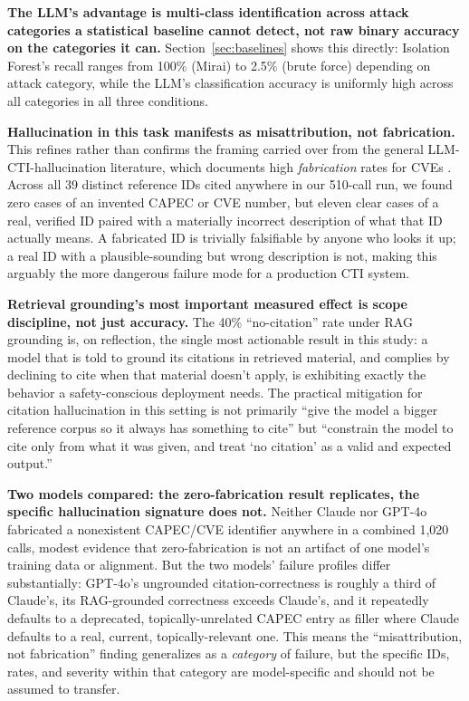 \documentclass[10pt,twocolumn]{article}
\begin{document}
\textbf{The LLM's advantage is multi-class identification across attack categories a statistical baseline cannot detect, not raw binary accuracy on the categories it can.} Section~\ref{sec:baselines} shows this directly: Isolation Forest's recall ranges from 100\% (Mirai) to 2.5\% (brute force) depending on attack category, while the LLM's classification accuracy is uniformly high across all categories in all three conditions.

\textbf{Hallucination in this task manifests as misattribution, not fabrication.} This refines rather than confirms the framing carried over from the general LLM-CTI-hallucination literature, which documents high \emph{fabrication} rates for CVEs \cite{hallucve}. Across all 39 distinct reference IDs cited anywhere in our 510-call run, we found zero cases of an invented CAPEC or CVE number, but eleven clear cases of a real, verified ID paired with a materially incorrect description of what that ID actually means. A fabricated ID is trivially falsifiable by anyone who looks it up; a real ID with a plausible-sounding but wrong description is not, making this arguably the more dangerous failure mode for a production CTI system.

\textbf{Retrieval grounding's most important measured effect is scope discipline, not just accuracy.} The 40\% ``no-citation'' rate under RAG grounding is, on reflection, the single most actionable result in this study: a model that is told to ground its citations in retrieved material, and complies by declining to cite when that material doesn't apply, is exhibiting exactly the behavior a safety-conscious deployment needs. The practical mitigation for citation hallucination in this setting is not primarily ``give the model a bigger reference corpus so it always has something to cite'' but ``constrain the model to cite only from what it was given, and treat `no citation' as a valid and expected output.''

\textbf{Two models compared: the zero-fabrication result replicates, the specific hallucination signature does not.} Neither Claude nor GPT-4o fabricated a nonexistent CAPEC/CVE identifier anywhere in a combined 1{,}020 calls, modest evidence that zero-fabrication is not an artifact of one model's training data or alignment. But the two models' failure profiles differ substantially: GPT-4o's ungrounded citation-correctness is roughly a third of Claude's, its RAG-grounded correctness exceeds Claude's, and it repeatedly defaults to a deprecated, topically-unrelated CAPEC entry as filler where Claude defaults to a real, current, topically-relevant one. This means the ``misattribution, not fabrication'' finding generalizes as a \emph{category} of failure, but the specific IDs, rates, and severity within that category are model-specific and should not be assumed to transfer.
\end{document}
